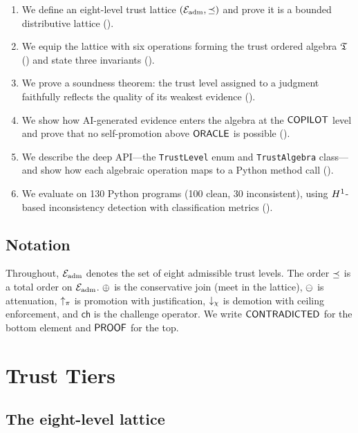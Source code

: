 \documentclass[11pt]{article}
\begin{document}
\begin{enumerate}[leftmargin=*]
\item We define an eight-level trust lattice $(\mathcal{E}_{\mathrm{adm}}, \preceq)$
      and prove it is a bounded distributive lattice
      ().
\item We equip the lattice with six operations forming
      the trust ordered algebra $\mathfrak{T}$
      () and state three invariants
      ().
\item We prove a soundness theorem: the trust level
      assigned to a judgment faithfully reflects the quality
      of its weakest evidence ().
\item We show how AI-generated evidence enters the algebra
      at the $\mathsf{COPILOT}$ level and prove that no
      self-promotion above $\mathsf{ORACLE}$ is possible
      ().
\item We describe the deep \JuGeo{} API---the
      \texttt{TrustLevel} enum and
      \texttt{TrustAlgebra} class---and show
      how each algebraic operation maps to a Python
      method call ().
\item We evaluate on 130 Python programs (100 clean,
      30 inconsistent), using $H^{1}$-based inconsistency
      detection with classification metrics
      ().
\end{enumerate}

\subsection{Notation}\label{sec:notation}

Throughout, $\mathcal{E}_{\mathrm{adm}}$ denotes the set of eight admissible trust
levels.  The order $\preceq$ is a total order on $\mathcal{E}_{\mathrm{adm}}$.
$\oplus$ is the conservative join (meet in the lattice),
$\ominus$ is attenuation, $\uparrow_\pi$ is promotion with
justification, $\downarrow_\chi$ is demotion with ceiling enforcement,
and $\mathsf{ch}$ is the challenge operator.  We write $\mathsf{CONTRADICTED}$
for the bottom element and $\mathsf{PROOF}$ for the top.

\section{Trust Tiers}\label{sec:tiers}

\subsection{The eight-level lattice}
\end{document}
